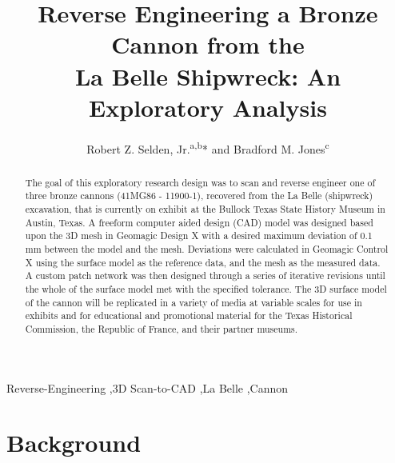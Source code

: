 \documentclass[review]{elsarticle}
\begin{document}
\begin{frontmatter}

\title{Reverse Engineering a Bronze Cannon from the\\La Belle Shipwreck: An Exploratory Analysis}

\author{Robert Z. Selden, Jr.\textsuperscript{a,b}* and Bradford M. Jones\textsuperscript{c}}
\address[1]{Heritage Research Center, Stephen F. Austin State University, USA}
\address[2]{Cultural Heritage Department, Jean Monnet University, FR}
\address[3]{Archeology Division, Texas Historical Commission, Austin, USA}

\begin{abstract}
The goal of this exploratory research design was to scan and reverse engineer one of three bronze cannons (41MG86 - 11900-1), recovered from the La Belle (shipwreck) excavation, that is currently on exhibit at the Bullock Texas State History Museum in Austin, Texas. A freeform computer aided design (CAD) model was designed based upon the 3D mesh in Geomagic Design X with a desired maximum deviation of 0.1 mm between the model and the mesh. Deviations were calculated in Geomagic Control X using the surface model as the reference data, and the mesh as the measured data. A custom patch network was then designed through a series of iterative revisions until the whole of the surface model met with the specified tolerance. The 3D surface model of the cannon will be replicated in a variety of media at variable scales for use in exhibits and for educational and promotional material for the Texas Historical Commission, the Republic of France, and their partner museums.
\end{abstract}

\begin{keyword}
Reverse-Engineering \sep 3D Scan-to-CAD \sep La Belle \sep Cannon


\end{keyword}

\end{frontmatter}

\linenumbers

\section*{Background}
\end{document}
